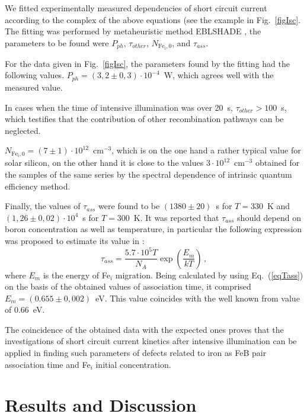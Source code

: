 \documentclass[sn-mathphys]{sn-jnl}%
\theoremstyle{thmstyleone}%
\theoremstyle{thmstyletwo}%
\theoremstyle{thmstylethree}%
\begin{document}
We fitted experimentally measured dependencies of short circuit current
according to the complex of the above equations (see the example in Fig.~\ref{figIsc}.
The fitting was performed by metaheuristic method EBLSHADE \cite{EBLSHADE},
the parameters to be found were $P_{ph}$, $\tau_{other}$, $N_\mathrm{Fe_i,0}$, and $\tau_{ass}$.

For the data given in Fig.~\ref{figIsc},
the parameters found by the fitting had the following values.
$P_{ph}=(3,2\pm0,3)\cdot10^{-4}$~W, which agrees well with the measured value.

In cases when the time of intensive illumination was over 20~s,
$\tau_{other}>100$~s, which testifies that the contribution of other recombination pathways can be neglected.

$N_\mathrm{Fe_i,0}=(7\pm1)\cdot10^{12}$~cm$^{-3}$,
      which is on the one hand a rather typical value for solar silicon,
      on the other hand it is close to the values $3\cdot10^{12}$~cm$^{-3}$
      obtained for the samples of the same series by the spectral dependence of intrinsic quantum efficiency method.

Finally, the values of $\tau_{ass}$ were found
  to be $(1380\pm20)$~s for $T=330$~K and $(1,26\pm0,02)\cdot10^4$~s for $T=300$~K.
  It was reported that $\tau_{ass}$ should depend on boron concentration as well as temperature,
  in particular the following expression was proposed to estimate its value in \cite{FeBAssJAP2014}:
\begin{equation}
\label{eqTass}
\tau_{ass}=\frac{5.7\cdot10^5T}{N_A}\exp\left(\frac{E_m}{kT}\right)\,,
\end{equation}
where
$E_m$ is the energy of Fe$_i$ migration.
Being calculated by using Eq.~(\ref{eqTass}) on the basis of the obtained
values of association time, it comprised $E_m=(0.655\pm0,002)$~eV.
This value coincides with the well known from \cite{FeBAssJAP2014,FeBkinAPL2008} value  of 0.66~eV.

The coincidence of the obtained data with the expected ones
proves that the investigations of short circuit current kinetics
after intensive illumination can be applied in finding such parameters of defects related to iron
as FeB pair association time and Fe$_i$ initial concentration.

\section{Results and Discussion}
\end{document}

